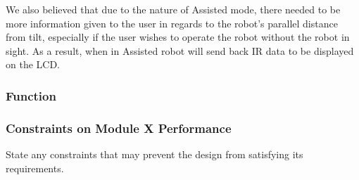 \documentclass{article}
\begin{document}
	We also believed that due to the nature of Assisted mode, there needed to be more information given to the user in regards to the robot's parallel distance from tilt, especially if the user wishes to operate the robot without the robot in sight. As a result, when in Assisted robot will send back IR data to be displayed on the LCD.
	
	\subsubsection{Function}
	
	
	\subsubsection{Constraints on Module X Performance}
	State any constraints that may prevent the design from satisfying its requirements.
	
	
	
	
\end{document}
